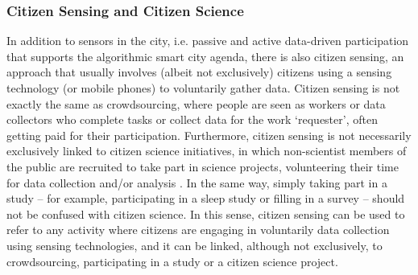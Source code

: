 \subsubsection{Citizen Sensing and Citizen Science}
\label{citizen-sensing}
In addition to sensors in the city, i.e. passive and active data-driven participation that supports the algorithmic smart city agenda, there is also citizen sensing, an approach that usually involves (albeit not exclusively) citizens using a sensing technology (or mobile phones) to voluntarily gather data. Citizen sensing is not exactly the same as crowdsourcing, where people are seen as workers or data collectors who complete tasks or collect data for the work `requester', often getting paid for their participation. Furthermore, citizen sensing is not necessarily exclusively linked to citizen science initiatives, in which non-scientist members of the public are recruited to take part in science projects, volunteering their time for data collection and/or analysis \citet{cohn_citizen_2008}. In the same way, simply taking part in a study -- for example, participating in a sleep study or filling in a survey -- should not be confused with citizen science. In this sense, citizen sensing can be used to refer to any activity where citizens are engaging in voluntarily data collection using sensing technologies, and it can be linked, although not exclusively, to crowdsourcing, participating in a study or a citizen science project.


